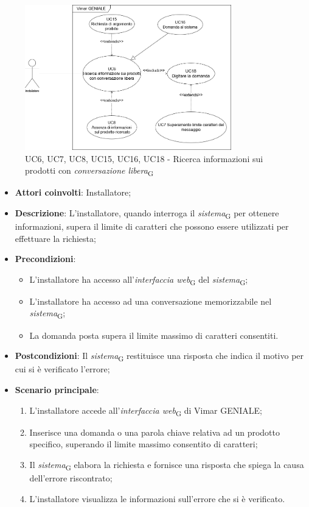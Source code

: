 \begin{figure}[H]
\centering
\includegraphics[width=0.8\textwidth]{contents/casi_duso/png/UC6.png}
\caption{UC6, UC7, UC8, UC15, UC16, UC18 - Ricerca informazioni sui prodotti con \textit{conversazione libera}\textsubscript{G}}
\end{figure}


\begin{itemize}
    \item \textbf{Attori coinvolti}: Installatore;
    \item \textbf{Descrizione}: L’installatore, quando interroga il \textit{sistema}\textsubscript{G} per ottenere informazioni, supera il limite di caratteri che possono essere utilizzati per effettuare la richiesta;
    \item \textbf{Precondizioni}: 
        \begin{itemize}
            \item L’installatore ha accesso all’\textit{interfaccia web}\textsubscript{G} del \textit{sistema}\textsubscript{G};
            \item L’installatore ha accesso ad una conversazione memorizzabile nel \textit{sistema}\textsubscript{G};
            \item La domanda posta supera il limite massimo di caratteri consentiti.
        \end{itemize}
    \item \textbf{Postcondizioni}: Il \textit{sistema}\textsubscript{G} restituisce una risposta che indica il motivo per cui si è verificato l’errore;
    \item \textbf{Scenario principale}:
    \begin{enumerate}
    \item L’installatore accede all’\textit{interfaccia web}\textsubscript{G} di Vimar GENIALE;
    \item Inserisce una domanda o una parola chiave relativa ad un prodotto specifico, superando il limite massimo consentito di caratteri;
    \item Il \textit{sistema}\textsubscript{G} elabora la richiesta e fornisce una risposta che spiega la causa dell'errore riscontrato;
    \item L’installatore visualizza le informazioni sull’errore che si è verificato.
    \end{enumerate}
\end{itemize}


